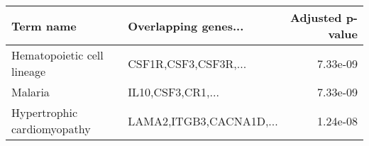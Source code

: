 \begin{tabular}{llr}
\toprule
                  Term name &    Overlapping genes... &  Adjusted p-value \\
\midrule
 Hematopoietic cell lineage &    CSF1R,CSF3,CSF3R,... &          7.33e-09 \\
                    Malaria &       IL10,CSF3,CR1,... &          7.33e-09 \\
Hypertrophic cardiomyopathy & LAMA2,ITGB3,CACNA1D,... &          1.24e-08 \\
\bottomrule
\end{tabular}
